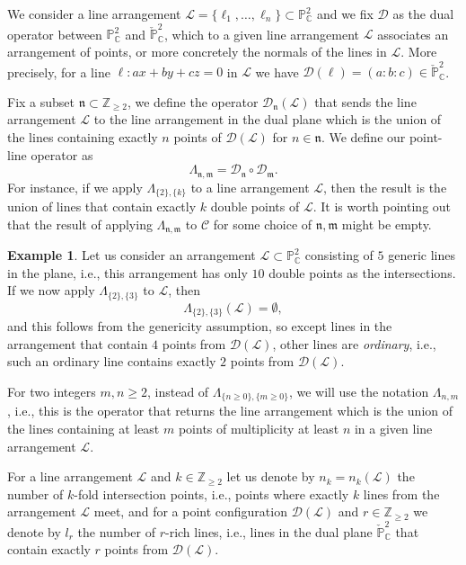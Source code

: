 \documentclass[11pt]{article}
\theoremstyle{plain}
\theoremstyle{definition}
\newtheorem{example}[thm]{Example}
\theoremstyle{plain}
\renewcommand\geq{\geqslant}
\newcommand\calc{{\mathcal C}}
\begin{document}
We consider a line arrangement $\mathcal{L} = \{\ell_{1}, \ldots, \ell_{n}\} \subset \mathbb{P}^{2}_{\mathbb{C}}$ and we fix $\mathcal{D}$ as the dual operator between $\mathbb{P}^{2}_{\mathbb{C}}$ and $\check{\mathbb{P}}^{2}_{\mathbb{C}}$, which to a given line arrangement $\mathcal{L}$ associates an arrangement of points, or more concretely the normals of the lines in $\mathcal{L}$. More precisely, for a line $\ell : ax + by + cz=0$ in $\mathcal{L}$ we have $\mathcal{D}(\ell) = (a:b:c) \in \check{\mathbb{P}}^{2}_{\mathbb{C}}$.

Fix a %
subset $\mathfrak{n} \subset \mathbb{Z}_{\geq 2}$, we define the operator $\mathcal{D}_{\mathfrak{n}}(\mathcal{L})$ that sends the line arrangement $\mathcal{L}$ to the line arrangement in the dual plane which is the union of the lines containing exactly $n$ points of $\mathcal{D}(\mathcal{L})$ for $n \in \mathfrak{n}$. We define our point-line operator as
$$\Lambda_{\mathfrak{n},\mathfrak{m}} =\mathcal{D}_{\mathfrak{n}}\circ \mathcal{D}_{\mathfrak{m}}.$$ 
For instance, if we apply $\Lambda_{\{2\},\{k\}}$ to a line arrangement $\mathcal{L}$, then the result is the union of lines that contain exactly $k$ double points of $\mathcal{L}$. It is worth pointing out that the result of applying $\Lambda_{\mathfrak{n},\mathfrak{m}}$ to $\calc$ for some choice of $\mathfrak{n}, \mathfrak{m}$ might be empty. 
\begin{example}
Let us consider an arrangement $\mathcal{L} \subset \mathbb{P}^{2}_{\mathbb{C}}$ consisting of $5$ generic lines in the plane, i.e., this arrangement has only $10$ double points as the intersections. If we now apply $\Lambda_{\{2\},\{3\}}$ to $\mathcal{L}$, then 
$$\Lambda_{\{2\},\{3\}}(\mathcal{L}) = \emptyset,$$
and this follows from the genericity assumption, so except lines in the arrangement that contain $4$ points from $\mathcal{D}(\mathcal{L})$, other lines are \emph{ordinary}, i.e., such an ordinary line contains exactly $2$ points from $\mathcal{D}(\mathcal{L})$.
\end{example}
For two integers $m,n\geq 2$, instead of $\Lambda_{\{n\geq 0\},\{m\geq 0\}}$, we 
will use the notation $\Lambda_{n,m}$, i.e.,  this is the operator that returns the line 
arrangement which is the union of the lines containing at least $m$ points of 
multiplicity at least $n$ in a given line arrangement $\mathcal{L}$.

For a line arrangement $\mathcal{L}$ and $k \in \mathbb{Z}_{\geq 2}$ let us denote by $n_{k} = n_{k}(\mathcal{L})$ the number of $k$-fold intersection points, i.e., points where exactly $k$ lines from the arrangement $\mathcal{L}$ meet, and for a point configuration $\mathcal{D}(\mathcal{L})$ and $r \in \mathbb{Z}_{\geq 2}$ we denote by $l_{r}$ the number of $r$-rich lines, i.e., lines in the dual plane $\check{\mathbb{P}}^{2}_{\mathbb{C}}$ that contain exactly $r$ points from $\mathcal{D}(\mathcal{L})$. 
\end{document}
